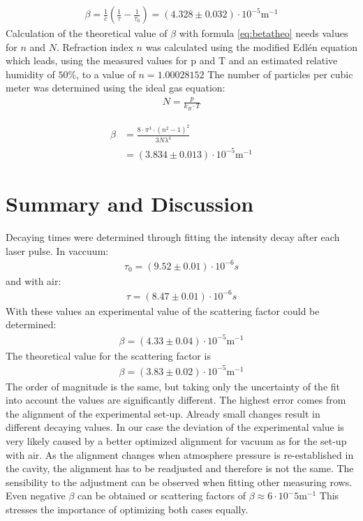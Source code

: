 \documentclass[
	parskip=half,10pt,
	numbers= noenddot, %
	toc=flat, %
	oneside,
	twocolumn,
	]{scrartcl}
\begin{document}
\begin{align}
\beta=\frac{1}{c}\left(\frac{1}{\tau}-\frac{1}{\tau_0}\right)=(4.328\pm0.032)\cdot 10^{-5}\si{\meter}^{-1}
\end{align}
Calculation of the theoretical value of $\beta$ with formula \ref{eq:betatheo} needs values for $n$ and $N$. Refraction index $n$ was calculated using the modified 
Edlén equation which leads, using the measured values for p and T and an estimated relative humidity of $50\%$, to a value of $n=1.00028152$\cite{edlen}
The number of particles per cubic meter was determined using the ideal gas equation:
\begin{align}
N=\frac{p}{k_B\cdot T}
\end{align}

\begin{align}
\beta &= \frac{8\cdot \pi^3\cdot (n^2-1)^2}{3 N \lambda^4} \\ & =(3.834\pm0.013)\cdot 10^{-5}\si{\meter}^{-1}
\end{align}

\section{Summary and Discussion}
Decaying times were determined through fitting the intensity decay after each laser pulse. 
In vaccuum:
\begin{align}
\tau_0=(9.52\pm0.01)\cdot 10^{-6}s
\end{align}
and with air:
\begin{align}
\tau=(8.47\pm0.01)\cdot 10^{-6}s
\end{align}
With these values an experimental value of the scattering factor could be determined: 
\begin{align}
\beta=(4.33\pm0.04)\cdot 10^{-5}\si{\meter}^{-1}
\end{align}
The theoretical value for the scattering factor is
\begin{align}
\beta=(3.83\pm0.02)\cdot 10^{-5}\si{\meter}^{-1}
\end{align}
The order of magnitude is the same, but taking only the uncertainty of the fit into account the values are significantly different.
The highest error comes from the alignment of the experimental set-up. Already small changes result in different decaying values. In our case the deviation of the 
experimental value is very likely caused by a better optimized alignment for vacuum as for the set-up with air. As the alignment changes when atmosphere pressure is 
re-established in the cavity, the alignment has to be readjusted and therefore is not the same.
The sensibility to the adjustment can be observed when fitting other measuring rows. Even negative $\beta$ can be obtained or scattering factors of 
$\beta\approx 6 \cdot 10^-5\si{\meter}^{-1}$
This stresses the importance of optimizing both cases equally.
\end{document}
